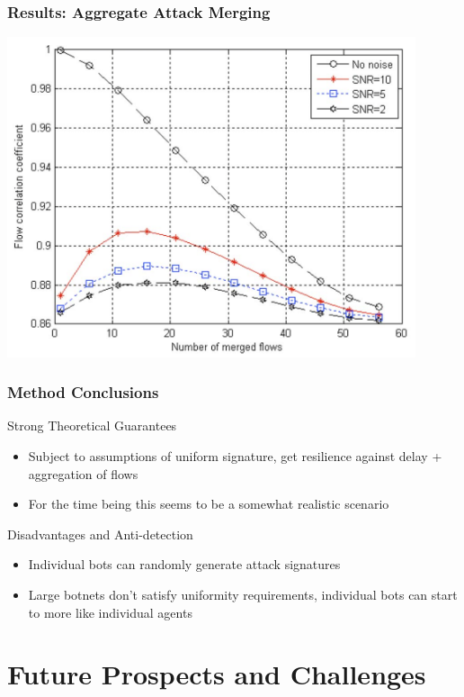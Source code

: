 \documentclass[10pt,mathserif]{beamer}
\begin{document}
\begin{frame}
  \frametitle{Results: Aggregate Attack Merging}
  \includegraphics[width=0.9\textwidth,natwidth=1016,natheight=796]{figures/aggregate_attack.png}
\end{frame}

\begin{frame}
  \frametitle{Method Conclusions}
  \begin{block}{Strong Theoretical Guarantees}
    \begin{itemize}
      \item Subject to assumptions of uniform signature, get resilience
        against delay + aggregation of flows
      \item For the time being this seems to be a somewhat realistic
        scenario
    \end{itemize}
  \end{block}
  \begin{block}{Disadvantages and Anti-detection}
    \begin{itemize}
      \item Individual bots can randomly generate attack signatures
      \item Large botnets don't satisfy uniformity requirements,
        individual bots can start to more like individual agents
    \end{itemize}
  \end{block}
\end{frame}

\section{Future Prospects and Challenges}
\end{document}
